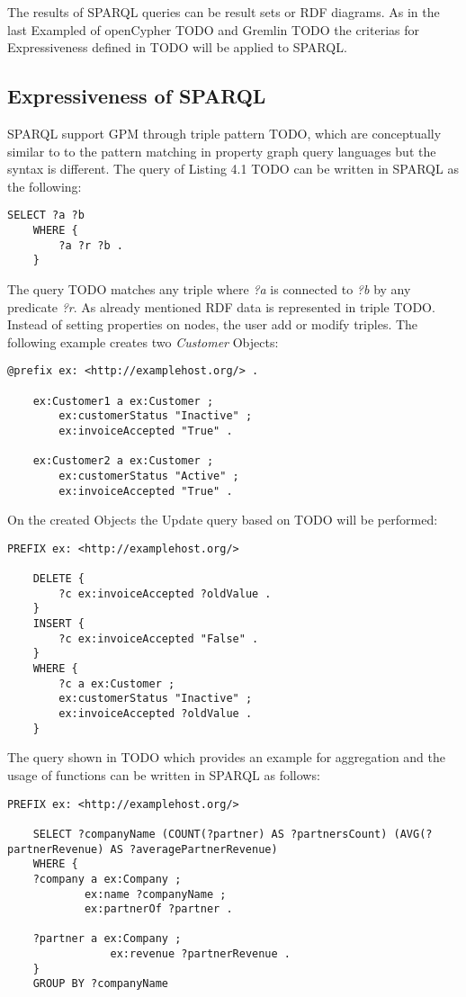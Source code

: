 The results of SPARQL queries can be result sets or RDF diagrams.\newline
As in the last Exampled of openCypher TODO and Gremlin TODO the criterias for Expressiveness
defined in TODO will be applied to SPARQL.
\subsection{Expressiveness of SPARQL}
SPARQL support GPM through triple pattern TODO, which are conceptually similar to 
to the pattern matching in property graph query languages but the syntax is 
different.
The query of Listing 4.1 TODO can be written in SPARQL as the following:
\begin{lstlisting}[caption={Graph Pattern Matching in SPARQL}, label={lst:GPMSPARQL}]
	SELECT ?a ?b
	WHERE {
  		?a ?r ?b .
	}
\end{lstlisting}
The query TODO matches any triple where \textit{?a} is connected to \textit{?b}
by any predicate \textit{?r}.
As already mentioned RDF data is represented in triple TODO. Instead of setting
properties on nodes, the user add or modify triples. The following example
creates two \textit{Customer} Objects:
\begin{lstlisting}[caption={Create Customer Objects in SPARQL}, label={lst:createSPARQL}]
	@prefix ex: <http://examplehost.org/> .

	ex:Customer1 a ex:Customer ;
		ex:customerStatus "Inactive" ;
		ex:invoiceAccepted "True" .

	ex:Customer2 a ex:Customer ;
		ex:customerStatus "Active" ;
		ex:invoiceAccepted "True" .
\end{lstlisting}
On the created Objects the Update query based on TODO will be performed:
\begin{lstlisting}[caption={Update Customer Objects in SPARQL}, label={lst:createSPARQL}]
	PREFIX ex: <http://examplehost.org/>

	DELETE {
		?c ex:invoiceAccepted ?oldValue .
	}
	INSERT {
		?c ex:invoiceAccepted "False" .
	}
	WHERE {
		?c a ex:Customer ;
		ex:customerStatus "Inactive" ;
		ex:invoiceAccepted ?oldValue .
	}
\end{lstlisting}
The query shown in TODO which provides an example for aggregation and the usage of functions 
can be written in SPARQL as follows:
\begin{lstlisting}[caption={Aggregation and Functions in SPARQL}, label={lst:aggFuncSPARQL}]
	PREFIX ex: <http://examplehost.org/>

	SELECT ?companyName (COUNT(?partner) AS ?partnersCount) (AVG(?partnerRevenue) AS ?averagePartnerRevenue)
	WHERE {
	?company a ex:Company ;
			ex:name ?companyName ;
			ex:partnerOf ?partner .
	
	?partner a ex:Company ;
				ex:revenue ?partnerRevenue .
	}
	GROUP BY ?companyName
\end{lstlisting}
